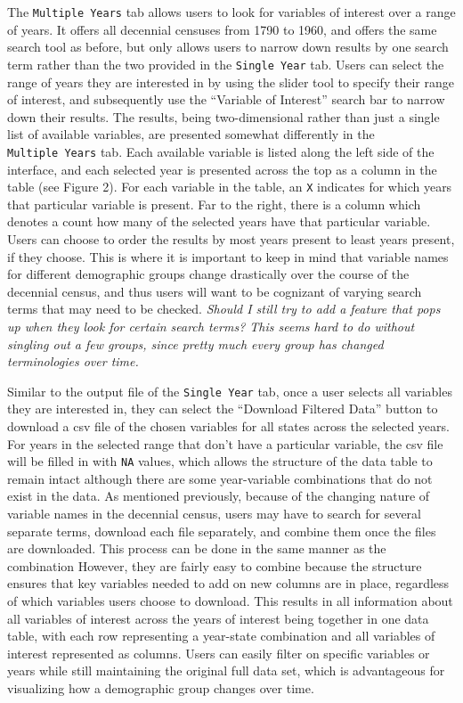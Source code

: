 \documentclass[11pt,]{article}
\begin{document}
The \texttt{Multiple\ Years} tab allows users to look for variables of
interest over a range of years. It offers all decennial censuses from
1790 to 1960, and offers the same search tool as before, but only allows
users to narrow down results by one search term rather than the two
provided in the \texttt{Single\ Year} tab. Users can select the range of
years they are interested in by using the slider tool to specify their
range of interest, and subsequently use the ``Variable of Interest''
search bar to narrow down their results. The results, being
two-dimensional rather than just a single list of available variables,
are presented somewhat differently in the \texttt{Multiple\ Years} tab.
Each available variable is listed along the left side of the interface,
and each selected year is presented across the top as a column in the
table (see Figure 2). For each variable in the table, an \texttt{X}
indicates for which years that particular variable is present. Far to
the right, there is a column which denotes a count how many of the
selected years have that particular variable. Users can choose to order
the results by most years present to least years present, if they
choose. This is where it is important to keep in mind that variable
names for different demographic groups change drastically over the
course of the decennial census, and thus users will want to be cognizant
of varying search terms that may need to be checked. \emph{Should I
still try to add a feature that pops up when they look for certain
search terms? This seems hard to do without singling out a few groups,
since pretty much every group has changed terminologies over time.}

Similar to the output file of the \texttt{Single\ Year} tab, once a user
selects all variables they are interested in, they can select the
``Download Filtered Data'' button to download a csv file of the chosen
variables for all states across the selected years. For years in the
selected range that don't have a particular variable, the csv file will
be filled in with \texttt{NA} values, which allows the structure of the
data table to remain intact although there are some year-variable
combinations that do not exist in the data. As mentioned previously,
because of the changing nature of variable names in the decennial
census, users may have to search for several separate terms, download
each file separately, and combine them once the files are downloaded.
This process can be done in the same manner as the combination However,
they are fairly easy to combine because the structure ensures that key
variables needed to add on new columns are in place, regardless of which
variables users choose to download. This results in all information
about all variables of interest across the years of interest being
together in one data table, with each row representing a year-state
combination and all variables of interest represented as columns. Users
can easily filter on specific variables or years while still maintaining
the original full data set, which is advantageous for visualizing how a
demographic group changes over time.
\end{document}

